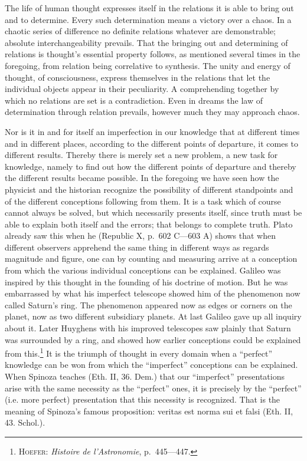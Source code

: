 \documentclass[12pt]{article}
\newcommand{\opage}[1]{\marginnote{\footnotesize\textit{[#1]}}}
\begin{document}
\opage{102}The life of human thought expresses itself in the relations it is able to
bring out and to determine. Every such determination means a victory over a
chaos. In a chaotic series of difference no definite relations whatever are
demonstrable; absolute interchangeability prevails. That the bringing out
and determining of relations is thought's essential property follows, as
mentioned several times in the foregoing, from relation being correlative to
synthesis. The unity and energy of thought, of consciousness, express
themselves in the relations that let the individual objects appear in their
peculiarity. A comprehending together by which no relations are set is a
contradiction. Even in dreams the law of determination through relation
prevails, however much they may approach chaos.

Nor is it in and for itself an imperfection in our knowledge that at
different times and in different places, according to the different points
of departure, it comes to different results. Thereby there is merely set a
new problem, a new task for knowledge, namely to find out how the different
points of departure and thereby the different results became possible. In
the foregoing we have seen how the physicist and the historian recognize the
possibility of different standpoints and of the different conceptions
following from them. It is a task which of course cannot always be solved,
but which necessarily presents itself, since truth must be able to explain
both itself and the errors; that belongs to complete truth. Plato already
saw this when he (Republic X, p.~602 C---603 A) shows that when different
observers apprehend the same thing in different ways as regards magnitude
and figure, one can by counting and measuring arrive at a conception from
which the various individual conceptions can be explained. Galileo was
inspired by this thought in \opage{103}the founding of his doctrine of motion. But he
was embarrassed by what his imperfect telescope showed him of the phenomenon
now called Saturn's ring. The phenomenon appeared now as edges or corners on
the planet, now as two different subsidiary planets. At last Galileo gave up
all inquiry about it. Later Huyghens with his improved telescopes saw
plainly that Saturn was surrounded by a ring, and showed how earlier
conceptions could be explained from this.\footnote{\textsc{Hoefer}:
\textit{Histoire de l'Astronomie}, p.~445---447.} It is the triumph of
thought in every domain when a ``perfect'' knowledge can be won from which
the ``imperfect'' conceptions can be explained. When Spinoza teaches (Eth.
II, 36. Dem.) that our ``imperfect'' presentations arise with the same
necessity as the ``perfect'' ones, it is precisely by the ``perfect'' (i.e.
more perfect) presentation that this necessity is recognized. That is the
meaning of Spinoza's famous proposition: veritas est norma sui et falsi
(Eth. II, 43. Schol.).
\end{document}
